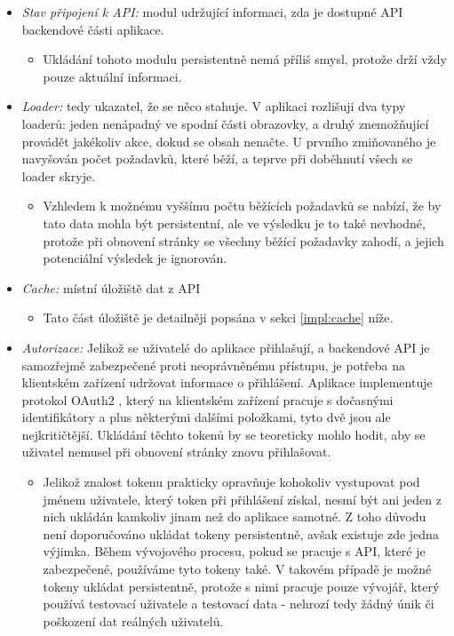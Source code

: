 \begin{itemize}
    \item \emph{Stav připojení k API:} modul udržující informaci, zda je dostupné API backendové části aplikace.
        \begin{itemize}
            \item Ukládání tohoto modulu persistentně nemá příliš smysl, protože drží vždy pouze aktuální informaci.
        \end{itemize}
    \item \emph{Loader:} tedy ukazatel, že se něco stahuje. V aplikaci rozlišuji dva typy loaderů: jeden nenápadný ve spodní části obrazovky, a druhý znemožňující provádět jakékoliv akce, dokud se obsah nenačte. U prvního zmiňovaného je navyšován počet požadavků, které běží, a teprve při doběhnutí všech se loader skryje.
        \begin{itemize}
            \item Vzhledem k možnému vyššímu počtu běžících požadavků se nabízí, že by tato data mohla být persistentní, ale ve výsledku je to také nevhodné, protože při obnovení stránky se všechny běžící požadavky zahodí, a jejich potenciální výsledek je ignorován.
        \end{itemize}
    \item \emph{Cache:} místní úložiště dat z API
        \begin{itemize}
            \item Tato část úložiště je detailněji popsána v sekci \ref{impl:cache} níže.
        \end{itemize}
    \item \emph{Autorizace:} Jelikož se uživatelé do aplikace přihlašují, a backendové API je samozřejmě zabezpečené proti neoprávněnému přístupu, je potřeba na klientském zařízení udržovat informace o přihlášení. Aplikace implementuje protokol OAuth2 \cite{oauth2rfc}, který na klientském zařízení pracuje s dočasnými identifikátory  a  plus některými dalšími položkami, tyto dvě jsou ale nejkritičtější. Ukládání těchto tokenů by se teoreticky mohlo hodit, aby se uživatel nemusel při obnovení stránky znovu přihlašovat.
        \begin{itemize}
            \item Jelikož znalost tokenu prakticky opravňuje kohokoliv vystupovat pod jménem uživatele, který token při přihlášení získal, nesmí být ani jeden z nich ukládán kamkoliv jinam než do aplikace samotné. Z toho důvodu není doporučováno ukládat tokeny persistentně, avšak existuje zde jedna výjimka. Během vývojového procesu, pokud se pracuje s API, které je zabezpečené, používáme tyto tokeny také. V takovém případě je možné tokeny ukládat persistentně, protože s nimi pracuje pouze vývojář, který používá testovací uživatele a testovací data - nehrozí tedy žádný únik či poškození dat reálných uživatelů.

\end{itemize}
\end{itemize}
